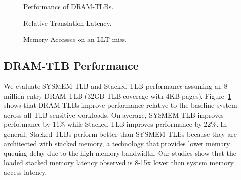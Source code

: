 \begin{figure}[tp] 
  \vspace{-0.in} \centering
  \centerline{}

  \caption{\small Performance of DRAM-TLBs. \normalsize}
  \label{fig:perf_DRAMTLB} 
  \vspace{0.2 in}
\end{figure}

\begin{figure}[tp] 
  \vspace{0.in} \centering
  \centerline{}

  \caption{\small Relative Translation Latency.\normalsize}
  \label{fig:tlblat_DRAMTLB} 
\end{figure}

\begin{figure}[tbh] 
  \vspace{0.2in} \centering
  \centerline{}

  \caption{\small Memory Accesses on an LLT miss.\normalsize}
 \label{fig:memaccess_DRAMTLB} 
  \vspace{0.0 in}
\end{figure}

\subsection{DRAM-TLB Performance}





\noindent We evaluate SYSMEM-TLB and Stacked-TLB performance assuming
an 8-million entry DRAM TLB (32GB TLB coverage with 4KB pages).
Figure~\ref{fig:perf_DRAMTLB} shows that DRAM-TLBs improve performance
relative to the baseline system across all TLB-sensitive workloads. On
average, SYSMEM-TLB improves performance by 11\% while Stacked-TLB
improves performance by 22\%. In general, Stacked-TLBs perform better
than SYSMEM-TLBs because they are architected with stacked memory, a
technology that provides lower memory queuing delay due to the high
memory bandwidth. Our studies show that the loaded stacked memory
latency observed is 8-15x lower than system memory access latency.

